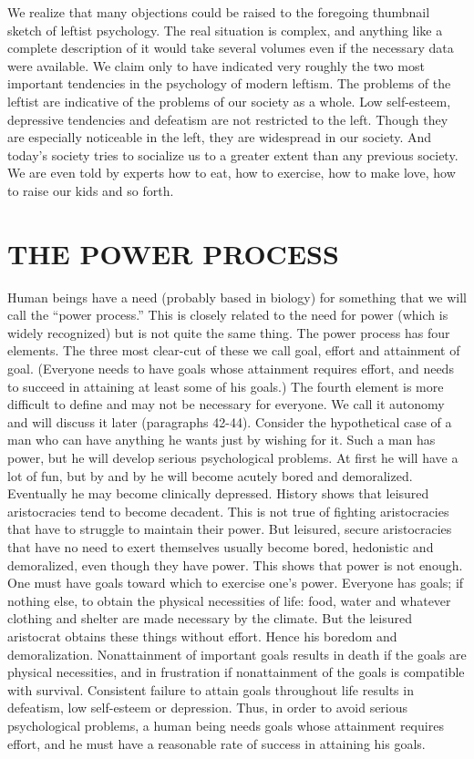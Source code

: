  We realize that many objections could be raised to the foregoing thumbnail sketch of leftist psychology. The real situation is complex, and anything like a complete description of it would take several volumes even if the necessary data were available. We claim only to have indicated very roughly the two most important tendencies in the psychology of modern leftism.
 The problems of the leftist are indicative of the problems of our society as a whole. Low self-esteem, depressive tendencies and defeatism are not restricted to the left. Though they are especially noticeable in the left, they are widespread in our society. And today’s society tries to socialize us to a greater extent than any previous society. We are even told by experts how to eat, how to exercise, how to make love, how to raise our kids and so forth.

\chapter{THE POWER PROCESS}

 Human beings have a need (probably based in biology) for something that we will call the “power process.” This is closely related to the need for power (which is widely recognized) but is not quite the same thing. The power process has four elements. The three most clear-cut of these we call goal, effort and attainment of goal. (Everyone needs to have goals whose attainment requires effort, and needs to succeed in attaining at least some of his goals.) The fourth element is more difficult to define and may not be necessary for everyone. We call it autonomy and will discuss it later (paragraphs 42-44).
 Consider the hypothetical case of a man who can have anything he wants just by wishing for it. Such a man has power, but he will develop serious psychological problems. At first he will have a lot of fun, but by and by he will become acutely bored and demoralized. Eventually he may become clinically depressed. History shows that leisured aristocracies tend to become decadent. This is not true of fighting aristocracies that have to struggle to maintain their power. But leisured, secure aristocracies that have no need to exert themselves usually become bored, hedonistic and demoralized, even though they have power. This shows that power is not enough. One must have goals toward which to exercise one’s power.
 Everyone has goals; if nothing else, to obtain the physical necessities of life: food, water and whatever clothing and shelter are made necessary by the climate. But the leisured aristocrat obtains these things without effort. Hence his boredom and demoralization.
 Nonattainment of important goals results in death if the goals are physical necessities, and in frustration if nonattainment of the goals is compatible with survival. Consistent failure to attain goals throughout life results in defeatism, low self-esteem or depression.
 Thus, in order to avoid serious psychological problems, a human being needs goals whose attainment requires effort, and he must have a reasonable rate of success in attaining his goals.

